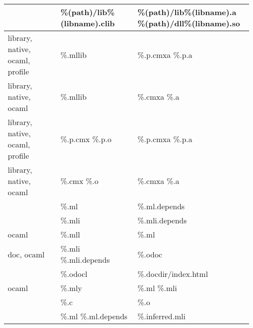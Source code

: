 \documentclass[9pt]{article}
\begin{document}
\begin{center}
\begin{tabular}{|l|l|p{5cm}|}
  \hline
    & \%(path)/lib\%(libname).clib & \%(path)/lib\%(libname).a \%(path)/dll\%(libname).so \\
  \hline
   library, native, ocaml, profile & \%.mllib  &  \%.p.cmxa \%.p.a  \\
  \hline
   library, native, ocaml &  \%.mllib  & \%.cmxa \%.a  \\
  \hline
   library, native, ocaml, profile & \%.p.cmx \%.p.o  &  \%.p.cmxa \%.p.a  \\
  \hline
   library, native, ocaml &  \%.cmx \%.o  & \%.cmxa \%.a  \\
  \hline
    &  \%.ml  &  \%.ml.depends  \\
  \hline
    &  \%.mli  &  \%.mli.depends  \\
  \hline
   ocaml &  \%.mll  &  \%.ml  \\
  \hline
   doc, ocaml &  \%.mli \%.mli.depends  &  \%.odoc  \\
  \hline
    &  \%.odocl  & \%.docdir/index.html \\
  \hline
   ocaml &  \%.mly  &  \%.ml \%.mli  \\
  \hline
    &  \%.c  &  \%.o  \\
  \hline
    &  \%.ml \%.ml.depends  & \%.inferred.mli  \\
  \hline
\end{tabular}
\end{center}
\end{document}
